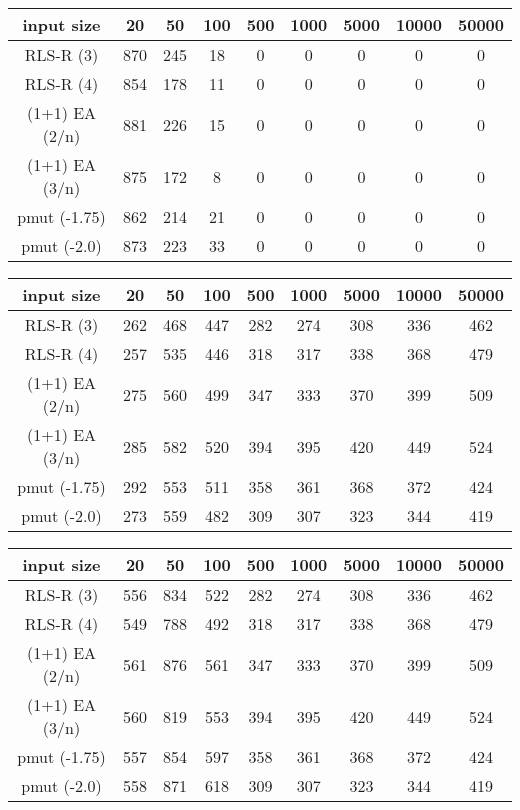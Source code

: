 \begin{tabular}[h]{ccccccccc}
      input size     & 20  & 50  & 100 & 500 & 1000 & 5000 & 10000 & 50000 \\\hline
      RLS-R (3)      & 870 & 245 & 18  & 0   & 0    & 0    & 0     & 0     \\
      RLS-R (4)      & 854 & 178 & 11  & 0   & 0    & 0    & 0     & 0     \\
      (1+1) EA (2/n) & 881 & 226 & 15  & 0   & 0    & 0    & 0     & 0     \\
      (1+1) EA (3/n) & 875 & 172 & 8   & 0   & 0    & 0    & 0     & 0     \\
      pmut (-1.75)   & 862 & 214 & 21  & 0   & 0    & 0    & 0     & 0     \\
      pmut (-2.0)    & 873 & 223 & 33  & 0   & 0    & 0    & 0     & 0     \\
\end{tabular}

\begin{tabular}[h]{ccccccccc}
      input size     & 20  & 50  & 100 & 500 & 1000 & 5000 & 10000 & 50000 \\\hline
      RLS-R (3)      & 262 & 468 & 447 & 282 & 274  & 308  & 336   & 462   \\
      RLS-R (4)      & 257 & 535 & 446 & 318 & 317  & 338  & 368   & 479   \\
      (1+1) EA (2/n) & 275 & 560 & 499 & 347 & 333  & 370  & 399   & 509   \\
      (1+1) EA (3/n) & 285 & 582 & 520 & 394 & 395  & 420  & 449   & 524   \\
      pmut (-1.75)   & 292 & 553 & 511 & 358 & 361  & 368  & 372   & 424   \\
      pmut (-2.0)    & 273 & 559 & 482 & 309 & 307  & 323  & 344   & 419   \\
\end{tabular}

\begin{tabular}[h]{ccccccccc}
      input size     & 20  & 50  & 100 & 500 & 1000 & 5000 & 10000 & 50000 \\\hline
      RLS-R (3)      & 556 & 834 & 522 & 282 & 274  & 308  & 336   & 462   \\
      RLS-R (4)      & 549 & 788 & 492 & 318 & 317  & 338  & 368   & 479   \\
      (1+1) EA (2/n) & 561 & 876 & 561 & 347 & 333  & 370  & 399   & 509   \\
      (1+1) EA (3/n) & 560 & 819 & 553 & 394 & 395  & 420  & 449   & 524   \\
      pmut (-1.75)   & 557 & 854 & 597 & 358 & 361  & 368  & 372   & 424   \\
      pmut (-2.0)    & 558 & 871 & 618 & 309 & 307  & 323  & 344   & 419   \\
\end{tabular}